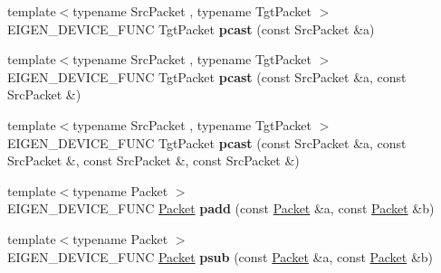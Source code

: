 \begin{DoxyCompactItemize}
\item 
\mbox{\label{namespace_eigen_1_1internal_a0b3ae9566e84e6f87029390857b5c86a}} 
{\footnotesize template$<$typename Src\+Packet , typename Tgt\+Packet $>$ }\\E\+I\+G\+E\+N\+\_\+\+D\+E\+V\+I\+C\+E\+\_\+\+F\+U\+NC Tgt\+Packet {\bfseries pcast} (const Src\+Packet \&a)
\item 
\mbox{\label{namespace_eigen_1_1internal_a5b0c7909de40a4428cc1205bf793bdd8}} 
{\footnotesize template$<$typename Src\+Packet , typename Tgt\+Packet $>$ }\\E\+I\+G\+E\+N\+\_\+\+D\+E\+V\+I\+C\+E\+\_\+\+F\+U\+NC Tgt\+Packet {\bfseries pcast} (const Src\+Packet \&a, const Src\+Packet \&)
\item 
\mbox{\label{namespace_eigen_1_1internal_a67b2547ec4eb2b1c8c55f5651fda200f}} 
{\footnotesize template$<$typename Src\+Packet , typename Tgt\+Packet $>$ }\\E\+I\+G\+E\+N\+\_\+\+D\+E\+V\+I\+C\+E\+\_\+\+F\+U\+NC Tgt\+Packet {\bfseries pcast} (const Src\+Packet \&a, const Src\+Packet \&, const Src\+Packet \&, const Src\+Packet \&)
\item 
\mbox{\label{namespace_eigen_1_1internal_a0f50f3baa0dcc73cd1c0baa06e5c8c13}} 
{\footnotesize template$<$typename Packet $>$ }\\E\+I\+G\+E\+N\+\_\+\+D\+E\+V\+I\+C\+E\+\_\+\+F\+U\+NC \hyperlink{union_eigen_1_1internal_1_1_packet}{Packet} {\bfseries padd} (const \hyperlink{union_eigen_1_1internal_1_1_packet}{Packet} \&a, const \hyperlink{union_eigen_1_1internal_1_1_packet}{Packet} \&b)
\item 
\mbox{\label{namespace_eigen_1_1internal_acfb1e7fe49c73d1885dea028b1745e6a}} 
{\footnotesize template$<$typename Packet $>$ }\\E\+I\+G\+E\+N\+\_\+\+D\+E\+V\+I\+C\+E\+\_\+\+F\+U\+NC \hyperlink{union_eigen_1_1internal_1_1_packet}{Packet} {\bfseries psub} (const \hyperlink{union_eigen_1_1internal_1_1_packet}{Packet} \&a, const \hyperlink{union_eigen_1_1internal_1_1_packet}{Packet} \&b)
\item 
\mbox{\label{namespace_eigen_1_1internal_af09888aebeb61a934e0d861356f404be}} 

\end{DoxyCompactItemize}
